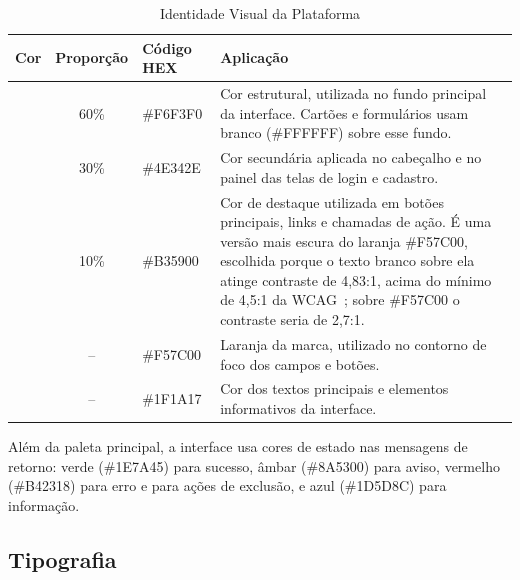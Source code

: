 \begin{table}[H]
\centering
\caption{Identidade Visual da Plataforma}
\label{tab:cores}
\begin{tabular}{|l|c|l|p{6cm}|}
\hline
\textbf{Cor} & \textbf{Proporção} & \textbf{Código HEX} & \textbf{Aplicação} \\
\hline

\colorbox[HTML]{F6F3F0}{\rule{0pt}{0.4cm}\hspace{1cm}} &
60\% &
\#F6F3F0 &
Cor estrutural, utilizada no fundo principal da interface. Cartões e formulários usam branco (\#FFFFFF) sobre esse fundo. \\
\hline

\colorbox[HTML]{4E342E}{\rule{0pt}{0.4cm}\hspace{1cm}} &
30\% &
\#4E342E &
Cor secundária aplicada no cabeçalho e no painel das telas de login e cadastro. \\
\hline

\colorbox[HTML]{B35900}{\rule{0pt}{0.4cm}\hspace{1cm}} &
10\% &
\#B35900 &
Cor de destaque utilizada em botões principais, links e chamadas de ação. É uma versão mais escura do laranja \#F57C00, escolhida porque o texto branco sobre ela atinge contraste de 4,83:1, acima do mínimo de 4,5:1 da WCAG~\cite{wcag22}; sobre \#F57C00 o contraste seria de 2,7:1. \\
\hline

\colorbox[HTML]{F57C00}{\rule{0pt}{0.4cm}\hspace{1cm}} &
-- &
\#F57C00 &
Laranja da marca, utilizado no contorno de foco dos campos e botões. \\
\hline

\colorbox[HTML]{1F1A17}{\rule{0pt}{0.4cm}\hspace{1cm}} &
-- &
\#1F1A17 &
Cor dos textos principais e elementos informativos da interface. \\
\hline

\end{tabular}
\end{table}

Além da paleta principal, a interface usa cores de estado nas mensagens de retorno: verde (\#1E7A45) para sucesso, âmbar (\#8A5300) para aviso, vermelho (\#B42318) para erro e para ações de exclusão, e azul (\#1D5D8C) para informação.

\subsection{Tipografia}

